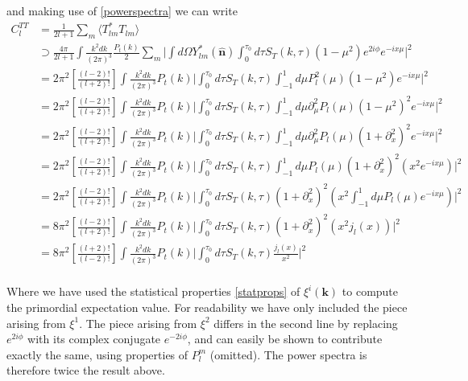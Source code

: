 \documentclass[a4paper,10pt]{article}
\renewcommand{\v}[1]{\mathbf{#1}}
\newcommand{\unit}[1]{\hat{\v{#1}}}
\newcommand{\ltwo}{\left[\frac{(l+2)!}{(l-2)!}\right]}
\newcommand{\ltwof}{\left[\frac{(l-2)!}{(l+2)!}\right]}
\begin{document}
and making use of \ref{powerspectra} we can write 
\begin{equation}\begin{split}
C_l^{TT} &= \frac{1}{2l+1}\sum_m \langle T_{lm}^*T_{lm} \rangle \\
&\supset \frac{4\pi}{2l+1} \int \frac{k^2dk}{(2\pi)^3}  \frac{P_t(k)}{2} \sum_m \bigg| \int d\Omega Y^*_{lm}(\unit{n}) \int_0^{\tau_0} d\tau  S_T(k,\tau)(1-\mu^2)e^{2i\phi}e^{-ix\mu} \bigg|^2\\
&= 2\pi^2\ltwof \int \frac{k^2dk}{(2\pi)^3}  P_t(k) \bigg|  \int_0^{\tau_0} d\tau  S_T(k,\tau)\int_{-1}^1 d\mu P_l^2(\mu)(1-\mu^2)e^{-ix\mu} \bigg|^2\\
&= 2\pi^2\ltwof \int \frac{k^2dk}{(2\pi)^3} P_t(k) \bigg|  \int_0^{\tau_0} d\tau  S_T(k,\tau)\int_{-1}^1 d\mu \partial_\mu^2P_l(\mu)(1-\mu^2)^2e^{-ix\mu}\bigg|^2\\
&= 2\pi^2\ltwof \int \frac{k^2dk}{(2\pi)^3}  P_t(k) \bigg|  \int_0^{\tau_0} d\tau  S_T(k,\tau)\int_{-1}^1 d\mu \partial_\mu^2P_l(\mu)(1+\partial_x^2)^2e^{-ix\mu} \bigg|^2\\
&= 2\pi^2\ltwof \int \frac{k^2dk}{(2\pi)^3}  P_t(k) \bigg|  \int_0^{\tau_0} d\tau  S_T(k,\tau)\int_{-1}^1 d\mu P_l(\mu)(1+\partial_x^2)^2(x^2e^{-ix\mu}) \bigg|^2\\
&= 2\pi^2\ltwof \int \frac{k^2dk}{(2\pi)^3}  P_t(k) \bigg|  \int_0^{\tau_0} d\tau  S_T(k,\tau)(1+\partial_x^2)^2\left(x^2 \int_{-1}^1 d\mu P_l(\mu)e^{-ix\mu} \right)\bigg|^2\\
&= 8\pi^2\ltwof \int \frac{k^2dk}{(2\pi)^3}  P_t(k) \bigg|  \int_0^{\tau_0} d\tau  S_T(k,\tau) (1+\partial_x^2)^2\left(x^2j_l(x) \right)\bigg|^2\\
&= 8\pi^2\ltwo \int \frac{k^2dk}{(2\pi)^3} P_t(k) \bigg|  \int_0^{\tau_0} d\tau  S_T(k,\tau)\frac{j_l(x)}{x^2} \bigg|^2\\
\end{split}\end{equation}

Where we have used the statistical properties \ref{statprops} of $\xi^i(\v{k})$ to compute the primordial expectation value. For readability we have only included the piece arising from $\xi^1$. The piece arising from $\xi^2$ differs in the second line by replacing $e^{2i\phi}$ with its complex conjugate $e^{-2i\phi}$, and can easily be shown to contribute exactly the same, using properties of $P_l^m$ (omitted). The power spectra is therefore twice the result above.\\
\end{document}
